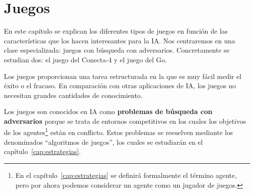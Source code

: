\chapter{Juegos}
\label{cap:juegos}
En este capítulo se explican los diferentes tipos de juegos en función de las características que los hacen interesantes para la IA.
Nos centraremos en una clase especializada: juegos con búsqueda con adversarios.
Concretamente se estudian dos: el juego del Conecta-4 y el juego del Go.

\bigskip
Los juegos proporcionan una tarea estructurada en la que es muy fácil medir el éxito o el fracaso. 
En comparación con otras aplicaciones de IA, los juegos no necesitan grandes cantidades de conocimiento.

Los juegos son conocidos en IA como \textbf{problemas de búsqueda con adversarios} porque se trata de entornos competitivos en los cuales los objetivos de los agentes\footnote{En el capítulo~\ref{cap:estrategias} se definirá formalmente el término agente, pero por ahora podemos considerar un agente como un jugador de juegos.
} están en conflicto.
Estos problemas se resuelven mediante los denominados ``algoritmos de juegos'', los cuales se estudiarán en el capítulo~\ref{cap:estrategias}.

